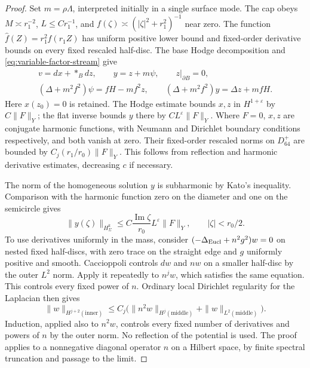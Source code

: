 \documentclass[11pt]{amsart}
\theoremstyle{definition}
\theoremstyle{remark}
\theoremstyle{plain}
\begin{document}
\begin{proof}
Set $m=\rho\Lambda$, interpreted initially in a single surface
mode. The cap obeys
$M\asymp r_1^{-2}$, $L\leq Cr_1^{-1}$, and
$f(\zeta)\asymp(|\zeta|^2+r_1^2)^{-1}$ near zero.
The function $\widehat f(Z)=r_1^2f(r_1Z)$ has uniform
positive lower bound and fixed-order derivative bounds on
every fixed rescaled half-disc.
The base Hodge decomposition and
\eqref{eq:variable-factor-stream} give
\begin{equation}\label{eq:localized-stream-equations}
 \begin{gathered}
  v=dx+*_Bdz,\qquad y=z+m\psi,\qquad z|_{\partial B}=0,\\
  (\Delta+m^2f^2)\psi=fH-mf^2z,\qquad
  (\Delta+m^2f^2)y=\Delta z+mfH.
 \end{gathered}
\end{equation}
Here $x(z_0)=0$ is retained. The Hodge estimate bounds
$x,z$ in $H^{1+\varepsilon}$ by $C\|F\|_Y$; the flat
inverse bounds $y$ there by $CL^\varepsilon\|F\|_Y$.
Where $F=0$, $x,z$ are conjugate harmonic functions, with
Neumann and Dirichlet boundary conditions respectively,
and both vanish at zero. Their fixed-order rescaled norms
on $D_{64}^+$ are bounded by
$C_j(r_1/r_0)\|F\|_Y$. This follows from reflection and
harmonic derivative estimates, decreasing $c$ if necessary.

The norm of the homogeneous solution $y$ is subharmonic by
Kato's inequality. Comparison with the harmonic function
zero on the diameter and one on the semicircle gives
\begin{equation}\label{eq:localized-coexact-vanishing}
 \|y(\zeta)\|_{H_\Sigma^k}
 \leq C\frac{\operatorname{Im}\zeta}{r_0}
                   L^\varepsilon\|F\|_Y,\qquad |\zeta|<r_0/2.
\end{equation}
To use derivatives uniformly in the mass, consider
$(-\Delta_{\rm Eucl}+n^2g^2)w=0$ on nested fixed half-discs,
with zero trace on the straight edge and $g$ uniformly
positive and smooth. Caccioppoli controls $dw$ and $nw$
on a smaller half-disc by the outer $L^2$ norm. Apply it
repeatedly to $n^jw$, which satisfies the same equation.
This controls every fixed power of $n$. Ordinary local
Dirichlet regularity for the Laplacian then gives
\[
 \|w\|_{H^{j+2}(\mathrm{inner})}
 \leq C_j\bigl(\|n^2w\|_{H^j(\mathrm{middle})}
                       +\|w\|_{L^2(\mathrm{middle})}\bigr).
\]
Induction, applied also to $n^2w$, controls every fixed number
of derivatives and powers of $n$ by the outer norm.
No reflection of the potential is used. The proof applies
to a nonnegative diagonal operator $n$ on a Hilbert space,
by finite spectral truncation and passage to the limit.


\end{proof}
\end{document}
